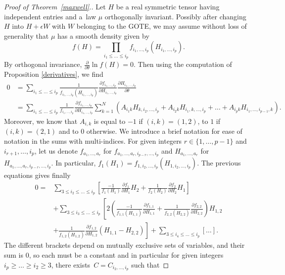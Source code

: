 \documentclass[10pt,a4paper]{amsart}
\begin{document}
\begin{proof}[Proof of Theorem~\ref{maxwell}.]
Let $H$ be a real symmetric tensor having independent entries and a~law $\mu$ orthogonally invariant. Possibly after changing $H$ into $H+\epsilon W$ with $W$ belonging to the GOTE, we may assume without loss of generality that $\mu$ has a smooth density given by
\[ f(H)=\prod_{i_1\leq \dots \leq i_p} f_{i_1,\dots,i_p}(H_{i_1,\dots,i_p}). \]
By orthogonal invariance,
$\frac{\partial}{\partial \theta} \ln f(H)=0$.
Then using the computation of Proposition \ref{derivatives}, we find
\begin{align*}
    0 &= \sum_{i_1\leq \dots \leq i_p} \frac{1}{f_{i_1,\dots,i_p}(H_{i_1,\dots,i_p})} \frac{\partial f_{i_1,\dots,i_p}}{\partial H_{i_1,\dots,i_p}} \frac{\partial H_{i_1,\dots,i_p}}{\partial \theta} \\
    &= \sum_{i_1\leq \dots \leq i_p} \frac{1}{f_{i_1,\dots,i_p}} \frac{\partial f_{i_1,\dots,i_p}}{\partial H_{i_1,\dots,i_p}} \sum_{k=1}^N (A_{i_1k}H_{k,i_2,\dots,i_p} + A_{i_2k}H_{i_1,k,\dots,i_p} + \dots + A_{i_pk}H_{i_1,\dots,i_{p-1},k}).
\end{align*}
Moreover, we know that $A_{i,k}$ is equal to $-1$ if $(i,k)=(1,2)$, to $1$ if $(i,k)=(2,1)$ and to $0$ otherwise. We introduce a brief notation for ease of notation in the sums with multi-indices. For given integers $r \in \{1,\dots, p-1\}$ and $i_{r+1},\dots,i_p$, let us denote $f_{a_1,\dots,a_r}$ for $f_{a_1,\dots,a_r,i_{p-r},\dots,i_p}$ and $H_{a_1,\dots,a_r}$ for $H_{a_1,\dots,a_r,i_{p-r},\dots,i_p}$. In particular, $f_1(H_1)=f_{1,i_{2},\dots,i_p}(H_{1,i_{2},\dots,i_p})$. The previous equations gives finally
\begin{align}
    0= {}&\sum_{3\leq i_2\leq \dots \leq i_p} \left[ \frac{-1}{f_1(H_1)} \frac{\partial f_{1}}{\partial H_{1}} H_2 + \frac{1}{f_2(H_2)} \frac{\partial f_{2}}{\partial H_{2}} H_1 \right]\nonumber\\
    &+ \sum_{3\leq i_3\leq \dots \leq i_p} \left[ 2 \left( \frac{-1}{f_{1,1}(H_{1,1})} \frac{\partial f_{1,1}}{\partial H_{1,1}} + \frac{1}{f_{2,2}(H_{2,2})} \frac{\partial f_{2,2}}{\partial H_{2,2}} \right) H_{1,2}\right.\nonumber\\
    & \left.+ \frac{1}{f_{1,2}(H_{1,2})} \frac{\partial f_{1,2}}{\partial H_{1,2}} (H_{1,1} - H_{2,2}) \right]+ \sum_{3\leq i_4\leq \dots \leq i_p} \left[ \dots \right].\label{eq-A}
\end{align}
The different brackets depend on mutually exclusive sets of variables, and their sum is $0$, so each must be a constant and in particular for given integers $i_p\geq \dots \geq i_2 \geq 3$, there exists~${C=C_{i_2,\dots,i_p}}$ such that

\end{proof}
\end{document}
